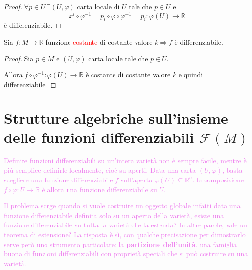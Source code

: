        \begin{proof}
        \mbox{}

        $\forall p \in U \ \exists (U, \varphi)$ carta locale di $U$ tale che $p \in U$ e
        \[
        x^i \circ \varphi^{-1} = p_i \circ \varphi \circ \varphi^{-1} = p_i \colon \varphi(U) \to \mathbb{R}
        \]
        è differenziabile.
        \end{proof}
        \begin{esempio}
        \label{es:funzioni_costanti_differenziabili}
        \mbox{}

        Sia $f \colon M \to \mathbb{R}$ funzione \textcolor{red}{costante} di costante valore $k \Rightarrow f$ è differenziabile.
        \end{esempio}

        \begin{proof}
        \mbox{} 

        Sia $p \in M$ e $(U, \varphi)$ carta locale tale che $p \in U$. 
        
        Allora $f \circ \varphi^{-1} \colon \varphi(U) \to \mathbb{R}$ è costante di costante valore $k$ e quindi differenziabile.
        \end{proof}
    \section{Strutture algebriche sull'insieme delle funzioni differenziabili \texorpdfstring{$\mathcal{F}(M)$}{(M)}}
        \textcolor{violet}{Definire funzioni differenziabili su un'intera varietà non è sempre facile, mentre è più semplice definirle localmente, cioè su aperti. 
        Data una carta $(U, \varphi)$, basta scegliere una funzione differenziabile $f$ sull'aperto $\varphi(U) \subseteq \mathbb{R}^n$: la composizione $f \circ \varphi \colon U \to \mathbb{R}$ è allora una funzione differenziabile su $U$.}

        \textcolor{violet}{Il problema sorge quando si vuole costruire un oggetto globale infatti data una funzione differenziabile definita solo su un aperto della varietà, esiste
        una funzione differenziabile su tutta la varietà che la estenda? In altre parole, vale un teorema di estensione? 
        La risposta è sì, con qualche precisazione per dimostrarlo serve però uno strumento particolare: la \textbf{partizione dell'unità}, una famiglia buona di funzioni differenziabili con proprietà speciali
        che si può costruire su una varietà.}

